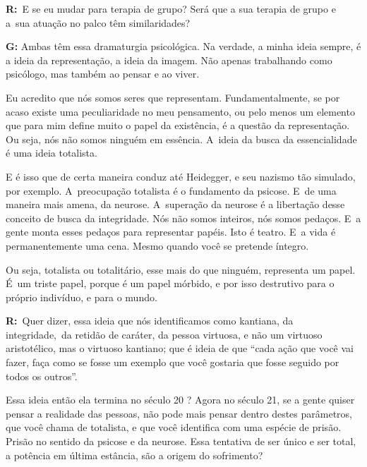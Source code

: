  

\textbf{R:}~E se eu mudar para terapia de grupo? Será que a sua terapia
de grupo e a\textbf{}~sua atuação no palco têm similaridades?

 

\textbf{G:} Ambas têm essa dramaturgia psicológica. Na verdade, a minha
ideia sempre, é a ideia da representação, a ideia da imagem. Não apenas
trabalhando como psicólogo, mas também ao pensar e ao viver.

 

Eu acredito que nós somos seres que representam. Fundamentalmente, se
por acaso existe uma peculiaridade no meu pensamento, ou pelo menos um
elemento que para mim define muito o papel da existência, é a questão da
representação. Ou seja, nós não somos ninguém em essência. A~ideia da
busca da essencialidade é uma ideia totalista.

 

E é isso que de certa maneira conduz até Heidegger, e seu nazismo tão
simulado, por exemplo. A~preocupação totalista é o fundamento da
psicose. E~de uma maneira mais amena, da neurose. A~superação da neurose
é a libertação desse conceito de busca da integridade. Nós não somos
inteiros, nós somos pedaços. E~a gente monta esses pedaços para
representar papéis. Isto é teatro. E~a vida é permanentemente uma cena.
Mesmo quando você se pretende íntegro.

 

Ou seja, totalista ou totalitário, esse mais do que ninguém, representa
um papel. É~um triste papel, porque é um papel mórbido, e por isso
destrutivo para o próprio indivíduo, e para o mundo.

 

\textbf{R:}~Quer dizer, essa ideia que nós identificamos como kantiana,
da integridade,\textbf{}~da retidão de caráter, da pessoa virtuosa, e
não um virtuoso aristotélico, mas o virtuoso kantiano; que é ideia de
que ``cada ação que você vai fazer, faça como se fosse um exemplo que
você gostaria que fosse seguido por todos os outros''.

 

Essa ideia então ela termina no século 20 ? Agora no século 21, se a
gente quiser pensar a realidade das pessoas, não pode mais pensar dentro
destes parâmetros, que você chama de totalista, e que você identifica
com uma espécie de prisão. Prisão no sentido da psicose e da neurose.
Essa tentativa de ser único e ser total, a potência em última estância,
são a origem do sofrimento?

